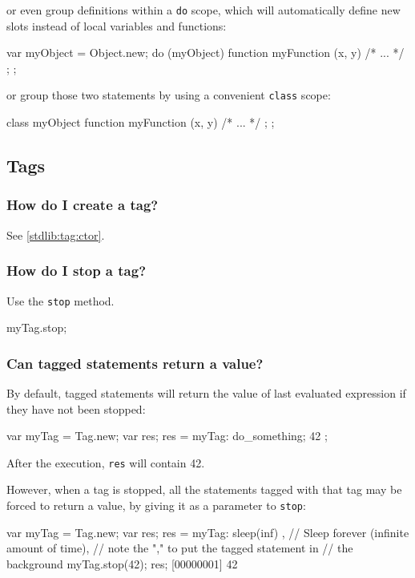 \noindent
or even group definitions within a \lstinline{do} scope, which will
automatically define new slots instead of local variables and
functions:

\begin{urbiunchecked}
var myObject = Object.new;
do (myObject)
{
  function myFunction (x, y) { /* ... */ };
};
\end{urbiunchecked}

\noindent
or group those two statements by using a convenient \lstinline{class}
scope:

\begin{urbiunchecked}
class myObject
{
  function myFunction (x, y) { /* ... */ };
};
\end{urbiunchecked}


\subsection{Tags}
\subsubsection{How do I create a tag?}
See \autoref{stdlib:tag:ctor}.

\subsubsection{How do I stop a tag?}

Use the \lstinline|stop| method.
\begin{urbiunchecked}
myTag.stop;
\end{urbiunchecked}

\subsubsection{Can tagged statements return a value?}
By default, tagged statements will return the value of last evaluated
expression if they have not been stopped:

\begin{urbiunchecked}
var myTag = Tag.new;
var res;
res = { myTag: { do_something; 42 } };
\end{urbiunchecked}

After the execution, \lstinline{res} will contain 42.

However, when a tag is stopped, all the statements tagged with that
tag may be forced to return a value, by giving it as a parameter to
\lstinline{stop}:

\begin{urbiunchecked}
var myTag = Tag.new;
var res;
{ res = { myTag: sleep(inf) } }, // Sleep forever (infinite amount of time),
                                 // note the "," to put the tagged statement in
                                 // the background
myTag.stop(42);
res;
[00000001] 42
\end{urbiunchecked}


